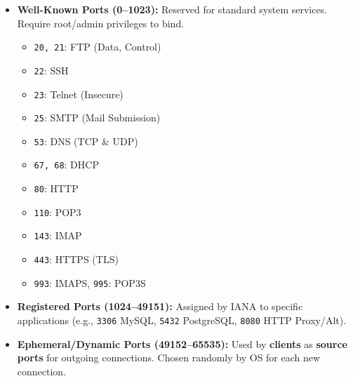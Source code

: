 \documentclass[11pt]{article}
\begin{document}
\begin{definition}
\begin{itemize}
    \item \textbf{Well-Known Ports (0--1023):} Reserved for standard system services. Require root/admin privileges to bind.
        \begin{itemize}
            \item \texttt{20, 21}: FTP (Data, Control)
            \item \texttt{22}: SSH
            \item \texttt{23}: Telnet (Insecure)
            \item \texttt{25}: SMTP (Mail Submission)
            \item \texttt{53}: DNS (TCP \& UDP)
            \item \texttt{67, 68}: DHCP
            \item \texttt{80}: HTTP
            \item \texttt{110}: POP3
            \item \texttt{143}: IMAP
            \item \texttt{443}: HTTPS (TLS)
            \item \texttt{993}: IMAPS, \texttt{995}: POP3S
        \end{itemize}
    \item \textbf{Registered Ports (1024--49151):} Assigned by IANA to specific applications (e.g., \texttt{3306} MySQL, \texttt{5432} PostgreSQL, \texttt{8080} HTTP Proxy/Alt).
    \item \textbf{Ephemeral/Dynamic Ports (49152--65535):} Used by \textbf{clients} as \textbf{source ports} for outgoing connections. Chosen randomly by OS for each new connection.
\end{itemize}
\end{definition}
\end{document}
